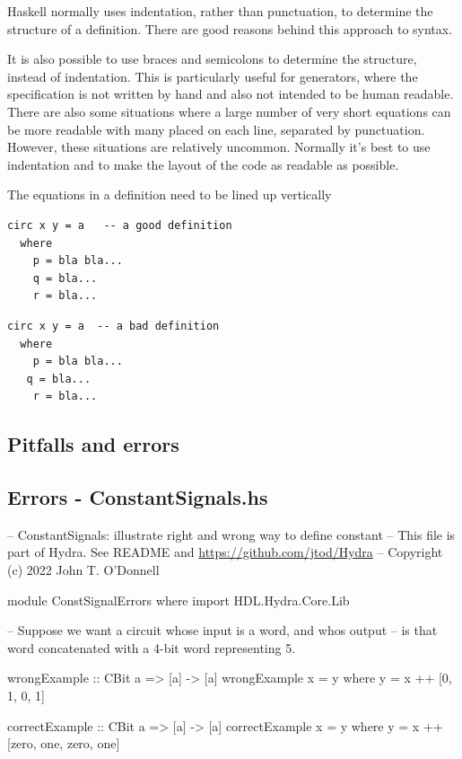 \documentclass[]{svmono}
\begin{document}
Haskell normally uses indentation, rather than punctuation, to
determine the structure of a definition.  There are good reasons
behind this approach to syntax.

It is also possible to use braces and semicolons to determine the
structure, instead of indentation.  This is particularly useful
for generators, where the specification is not written by hand and
also not intended to be human readable.  There are also some
situations where a large number of very short equations can be
more readable with many placed on each line, separated by
punctuation.  However, these situations are relatively uncommon.
Normally it's best to use indentation and to make the layout of
the code as readable as possible.

The equations in a definition need to be lined up vertically

\begin{verbatim}
circ x y = a   -- a good definition
  where
    p = bla bla...
    q = bla...
    r = bla...
\end{verbatim}

\begin{verbatim}
circ x y = a  -- a bad definition
  where
    p = bla bla...
   q = bla...
    r = bla...
\end{verbatim}
\subsection*{Pitfalls and errors}
\label{sec:org0e654e5}
\subsection*{Errors - ConstantSignals.hs}
\label{sec:org40c5109}

-- ConstantSignals: illustrate right and wrong way to define constant
-- This file is part of Hydra. See README and \url{https://github.com/jtod/Hydra}
-- Copyright (c) 2022 John T. O'Donnell

module ConstSignalErrors where
import HDL.Hydra.Core.Lib

-- Suppose we want a circuit whose input is a word, and whos output
-- is that word concatenated with a 4-bit word representing 5.

wrongExample :: CBit a => [a] -> [a]
wrongExample x = y
  where
    y = x ++ [0, 1, 0, 1]

correctExample :: CBit a => [a] -> [a]
correctExample x = y
  where
    y = x ++ [zero, one, zero, one]
\end{document}
